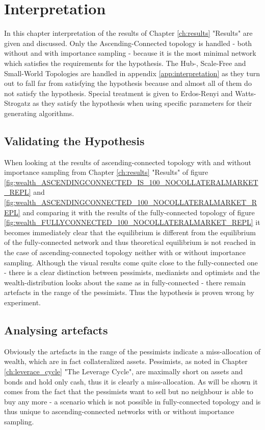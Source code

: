 \documentclass[Bachelorarbeit.tex]{subfiles}
\begin{document}
\graphicspath{{./figures/interpretation/}}	%

\chapter{Interpretation}
In this chapter interpretation of the results of Chapter \ref{ch:results} "Results" are given and discussed. Only the Ascending-Connected topology is handled - both without and with importance sampling - because it is the most minimal network which satisfies the requirements for the hypothesis. The Hub-, Scale-Free and Small-World Topologies are handled in appendix \ref{app:interpretation} as they turn out to fall far from satisfying the hypothesis because and almost all of them do not satisfy the hypothesis. Special treatment is given to Erdos-Renyi and Watts-Strogatz as they satisfy the hypothesis when using specific parameters for their generating algorithms.

\section{Validating the Hypothesis}
When looking at the results of ascending-connected topology with and without importance sampling from Chapter \ref{ch:results} "Results" of figure \ref{fig:wealth_ASCENDINGCONNECTED_IS_100_NOCOLLATERALMARKET_REPL} and \ref{fig:wealth_ASCENDINGCONNECTED_100_NOCOLLATERALMARKET_REPL} and comparing it with the results of the fully-connected topology of figure \ref{fig:wealth_FULLYCONNECTED_100_NOCOLLATERALMARKET_REPL} it becomes immediately clear that the equilibrium is different from the equilibrium of the fully-connected network and thus theoretical equilibrium is not reached in the case of ascending-connected topology neither with or without importance sampling. Although the visual results come quite close to the fully-connected one - there is a clear distinction between pessimists, medianists and optimists and the wealth-distribution looks about the same as in fully-connected - there remain artefacts in the range of the pessimists. Thus the hypothesis is proven wrong by experiment.

\section{Analysing artefacts}
Obviously the artefacts in the range of the pessimists indicate a miss-allocation of wealth, which are in fact collateralized assets. Pessimists, as noted in Chapter \ref{ch:leverace_cycle} "The Leverage Cycle", are maximally short on assets and bonds and hold only cash, thus it is clearly a miss-allocation. As will be shown it comes from the fact that the pessimists want to sell but no neighbour is able to buy any more - a scenario which is not possible in fully-connected topology and is thus unique to ascending-connected networks with or without importance sampling.
\end{document}

